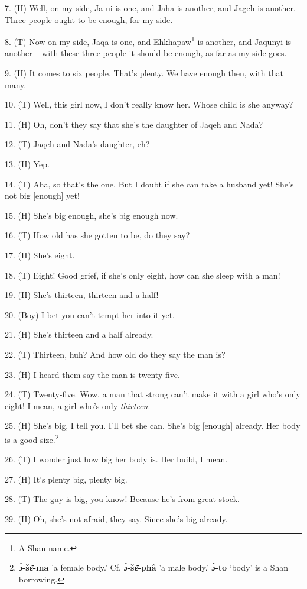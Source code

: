 7. (H) Well, on my side, Ja-ui is one, and Jaha is another, and Jageh is another.
Three people ought to be enough, for my side.

8. (T) Now on my side, Jaqa is one, and Ehkhapaw\footnote{A Shan name.} is another, and Jaqunyi is
another -- with these three people it should be enough, as far as my side goes.

9. (H) It comes to six people. That's plenty. We have enough then, with that many.

10. (T) Well, this girl now, I don't really know her. Whose child is she anyway?

11. (H) Oh, don't they say that she's the daughter of Jaqeh and Nada?

12. (T) Jaqeh and Nada's daughter, eh?

13. (H) Yep.

14. (T) Aha, so that's the one. But I doubt if she can take a husband yet! She's
not big [enough] yet!

15. (H) She's big enough, she's big enough now.

16. (T) How old has she gotten to be, do they say?

17. (H) She's eight.

18. (T) Eight! Good grief, if she's only eight, how can she sleep with a man!

19. (H)  She's thirteen, thirteen and a half!

20. (Boy) I bet you can't tempt her into it yet.

21. (H) She's thirteen and a half already.

22. (T) Thirteen, huh? And how old do they say the man is?

23. (H) I heard them say the man is twenty-five.

24. (T) Twenty-five. Wow, a man that strong can't make it with a girl who's only
eight! I mean, a girl who's only \textit{thirteen}.

25. (H) She's big, I tell you. I'll bet she can. She's big [enough] already. Her
body is a good size.\footnote{\textbf{ɔ̀-šɛ̄-ma} 'a female body.' Cf. \textbf{ɔ̀-šɛ̄-phâ} 'a male body.' \textbf{ɔ̀-to} `body' is a Shan borrowing.}

26. (T) I wonder just how big her body is. Her build, I mean.

27. (H) It's plenty big, plenty big.

28. (T) The guy is big, you know! Because he's from great stock.

29. (H) Oh, she's not afraid, they say. Since she's big already.

